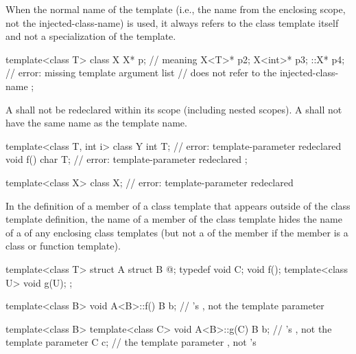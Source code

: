 \pnum
When the normal name of the template (i.e., the name from
the enclosing scope, not the injected-class-name) is
used,
it always refers to the class template itself and not a
specialization of the template.
\begin{example}

\begin{codeblock}
template<class T> class X {
  X* p;             // meaning 
  X<T>* p2;
  X<int>* p3;
  ::X* p4;          // error: missing template argument list
                    //  does not refer to the injected-class-name
};
\end{codeblock}
\end{example}

\pnum
A
shall not be redeclared within its scope (including nested scopes).
A
shall not have the same name as the template name.
\begin{example}

\begin{codeblock}
template<class T, int i> class Y {
  int T;            // error: template-parameter redeclared
  void f() {
    char T;         // error: template-parameter redeclared
  }
};

template<class X> class X;      // error: template-parameter redeclared
\end{codeblock}
\end{example}

\pnum
In the definition of a member of
a class template that appears outside of the class template definition,
the name of a member of the class template hides the name of a
of any enclosing class templates (but not a  of the
member if the member is a class or function template).
\begin{example}

\begin{codeblock}
template<class T> struct A {
  struct B { @\commentellip@ };
  typedef void C;
  void f();
  template<class U> void g(U);
};

template<class B> void A<B>::f() {
  B b;              // 's , not the template parameter
}

template<class B> template<class C> void A<B>::g(C) {
  B b;              // 's , not the template parameter
  C c;              // the template parameter , not 's 
}
\end{codeblock}
\end{example}

